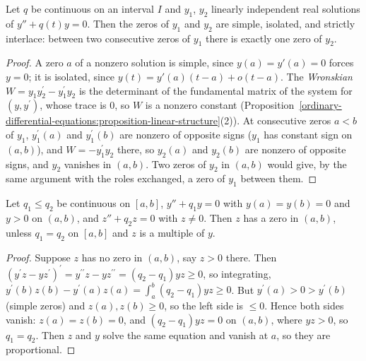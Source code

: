 \begin{theorem}\label{ordinary-differential-equations:theorem-sturm-separation}
Let $q$ be continuous on an interval $I$ and $y_1$, $y_2$ linearly independent real solutions of $y'' + q(t)y = 0$. Then the zeros of $y_1$ and $y_2$ are simple, isolated, and strictly interlace: between two consecutive zeros of $y_1$ there is
exactly one zero of $y_2$.
\end{theorem}

\begin{proof}
A zero $a$ of a nonzero solution is simple, since $y(a) = y'(a) = 0$ forces $y = 0$; it is isolated, since $y(t) = y'(a)(t - a) + o(t - a)$. The \emph{Wronskian} $W = y_1y_2^{\prime} - y_1^{\prime}y_2$ is the determinant of the fundamental
matrix of the system for $(y, y^{\prime})$, whose trace is $0$, so $W$ is a nonzero constant (Proposition~\ref{ordinary-differential-equations:proposition-linear-structure}(2)). At consecutive zeros $a < b$ of $y_1$, $y_1^{\prime}(a)$ and $y_1^{\prime}(b)$
are nonzero of opposite signs ($y_1$ has constant sign on $(a, b)$), and $W = -y_1^{\prime}y_2$ there, so $y_2(a)$ and $y_2(b)$ are nonzero of opposite signs, and $y_2$ vanishes in $(a, b)$. Two zeros of $y_2$ in $(a, b)$ would give, by the same
argument with the roles exchanged, a zero of $y_1$ between them.
\end{proof}

\begin{theorem}\label{ordinary-differential-equations:theorem-sturm-comparison}
Let $q_1 \leq q_2$ be continuous on $[a, b]$, $y'' + q_1y = 0$ with $y(a) = y(b) = 0$ and $y > 0$ on $(a, b)$, and $z'' + q_2z = 0$ with $z \neq 0$. Then $z$ has a zero in $(a, b)$, unless $q_1 = q_2$ on $[a, b]$ and $z$ is a multiple of $y$.
\end{theorem}

\begin{proof}
Suppose $z$ has no zero in $(a, b)$, say $z > 0$ there. Then $(y^{\prime}z - yz^{\prime})^{\prime} = y^{\prime\prime}z - yz^{\prime\prime} = (q_2 - q_1)yz \geq 0$, so integrating, $y^{\prime}(b)z(b) - y^{\prime}(a)z(a) = \int_a^b(q_2 - q_1)yz \geq 0$.
But $y^{\prime}(a) > 0 > y^{\prime}(b)$ (simple zeros) and $z(a), z(b) \geq 0$, so the left side is $\leq 0$. Hence both sides vanish: $z(a) = z(b) = 0$, and $(q_2 - q_1)yz = 0$ on $(a, b)$, where $yz > 0$, so $q_1 = q_2$. Then $z$ and $y$ solve the same
equation and vanish at $a$, so they are proportional.
\end{proof}

